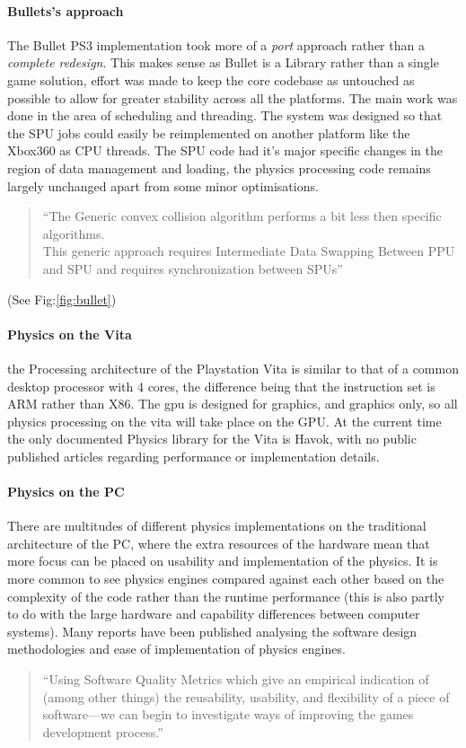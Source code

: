 \documentclass[conference]{acmsiggraph}
\begin{document}
\paragraph{Bullets's approach}
The Bullet PS3 implementation took more of a \textit{port} approach rather than a \textit{complete redesign}. This makes sense as Bullet is a Library rather than a single game solution, effort was made to keep the core codebase as untouched as possible to allow for greater stability across all the platforms. The main work was done in the area of scheduling and threading. The system was designed so that the SPU jobs could easily be reimplemented on another platform like the Xbox360 as CPU threads. The SPU code had it's major specific changes in the region of data management and loading, the physics processing code remains largely unchanged apart from some minor optimisations.
\begin{quote}
``The Generic convex collision algorithm performs a bit less then specific algorithms.\\
This generic approach requires Intermediate Data Swapping Between PPU and SPU and requires synchronization between SPUs''
\cite{spuphys}
\end{quote}
(See Fig:\ref{fig:bullet})

\paragraph{Physics on the Vita}
the Processing architecture of the Playstation Vita is similar to that of a common desktop processor with 4 cores, the difference being that the instruction set is ARM rather than X86. The gpu is designed for graphics, and graphics only, so all physics processing on the vita will take place on the GPU. At the current time the only documented Physics library for the Vita is Havok, with no public published articles regarding performance or implementation details. 

\paragraph{Physics on the PC}
There are multitudes of different physics implementations on the traditional architecture of the PC, where the extra resources of the hardware mean that more focus can be placed on usability and implementation of the physics. It is more common to see physics engines compared against each other based on the complexity of the code rather than the runtime performance (this is also partly to do with the large hardware and capability differences between computer systems). Many reports have been published analysing the software design methodologies and ease of implementation of physics engines. 
\begin{quote}
``Using Software Quality Metrics which give an empirical indication of (among other
things) the reusability, usability, and flexibility of a piece of software—we can begin to
investigate ways of improving the games development process.''\cite{comparison}
\end{quote}
\end{document}
